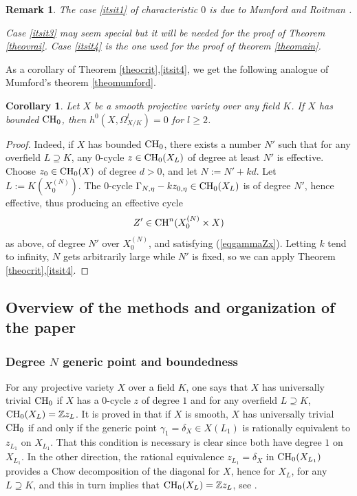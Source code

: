 \documentclass[10pt]{article}
\newtheorem{coro}[theo]{Corollary}
\newtheorem{rema}[theo]{Remark}
\begin{document}
\begin{rema}{\rm The case \ref{itsit1} of characteristic $0$   is due to Mumford \cite{mumford} and Roitman \cite{roitman}.

 Case \ref{itsit3} may seem special but it will be needed  for the proof of Theorem \ref{theovrai}.
Case \ref{itsit4} is the one used for the proof of theorem \ref{theomain}.}
\end{rema}
As a corollary of Theorem \ref{theocrit},\ref{itsit4}, we get the following analogue of Mumford's theorem \ref{theomumford}.
\begin{coro}\label{corofautilleprouver}  Let $X$ be a smooth projective variety over any field $K$. If $X$ has bounded ${\rm CH}_0$, then $h^0(X,\Omega_{X/K}^l)=0$ for $l\geq 2$.
\end{coro}
\begin{proof} Indeed, if $X$  has bounded ${\rm CH}_0$, there exists a number $N'$ such that for any overfield $L\supseteq K$, any $0$-cycle $z\in{\rm CH}_0(X_L)$ of degree at least $N'$ is effective. Choose $z_0\in{\rm CH}_0(X)$ of degree $d>0$, and let $N:=N'+k d$. Let $L:=K(X^{(N)}_0)$. The $0$-cycle $\Gamma_{N,\eta}-kz_{0,\eta}\in {\rm CH}_0(X_L)$ is of degree $N'$, hence effective, thus producing an effective  cycle $$Z'\in{\rm CH}^n(X^{(N)}_0\times X)$$ as above, of degree $N'$ over $X^{(N)}_0$, and satisfying (\ref{eqgammaZx}). Letting $k$ tend to infinity,  $N$ gets  arbitrarily large while  $N'$ is fixed, so  we can apply Theorem \ref{theocrit},\ref{itsit4}.
\end{proof}

\subsection{Overview of the methods and organization of the paper}
\subsubsection{Degree $N$ generic point and boundedness \label{secgenpointsNintro}}
For any projective variety $X$ over a field $K$, one  says that $X$ has universally trivial ${\rm CH}_0$ if $X$ has a $0$-cycle $z$  of degree $1$ and for any overfield $L\supseteq K$, ${\rm CH}_0(X_L)=\mathbb{Z}z_L$. It is  proved in \cite{AuCTPa} that if $X$ is smooth, $X$ has universally trivial ${\rm CH}_0$ if and only if  the generic point $\gamma_1=\delta_{X}\in X(L_1)$ is rationally equivalent to $z_{L_1}$ on $X_{L_1}$. That this condition is necessary is clear since both have degree $1$ on $X_{L_1}$. In the other direction, the rational equivalence $z_{L_1}=\delta_X$ in ${\rm CH}_0(X_{L_1})$ provides a Chow decomposition of the diagonal for $X$, hence for  $X_L$, for any $L\supseteq K$, and this in turn implies that ${\rm CH}_0(X_L)=\mathbb{Z}z_L$, see \cite{AuCTPa}.
\end{document}
